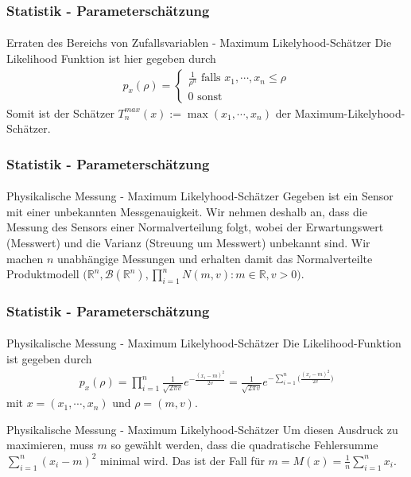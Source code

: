 \documentclass{beamer}
\begin{document}
\begin{frame}
    \frametitle{Statistik - Parameterschätzung}
\framesubtitle{}
\begin{block}{Erraten des Bereichs von Zufallsvariablen - Maximum Likelyhood-Schätzer}
Die Likelihood Funktion ist hier gegeben durch
\begin{align*}
p_x (\rho) =  \begin{cases}  \frac{1}{\rho^n}  \text{ falls }  x_1, \cdots , x_n \leq \rho  \\  0  \text{ sonst}\end {cases}
\end{align*}
Somit ist der Schätzer $T_n^{max} (x) := \max (x_1, \cdots , x_n )$ der Maximum-Likelyhood-Schätzer.
\end{block}

 \end{frame}




\begin{frame}
    \frametitle{Statistik - Parameterschätzung}
\framesubtitle{}
\begin{block}{Physikalische Messung - Maximum Likelyhood-Schätzer}
Gegeben ist ein Sensor mit einer unbekannten Messgenauigkeit. Wir nehmen deshalb an, dass die Messung des Sensors einer Normalverteilung folgt, 
wobei der Erwartungswert (Messwert) und die Varianz (Streuung um Messwert) unbekannt sind. Wir machen $n$ unabhängige Messungen und erhalten damit das Normalverteilte Produktmodell $\bigl(\mathbb{R}^n, \mathcal{B}(\mathbb{R}^n), \prod_{i=1}^n N(m,v): m \in \mathbb{R}, v  >0 \bigr)$. 

\end{block}

 \end{frame}



\begin{frame}
    \frametitle{Statistik - Parameterschätzung}
\framesubtitle{}
\begin{block}{Physikalische Messung - Maximum Likelyhood-Schätzer}
Die Likelihood-Funktion ist gegeben durch
\begin{align*}
p_x(\rho) =  \prod_{i=1}^n \frac {1}{ \sqrt{2 \pi v }} e^{- \frac{(x_i- m)^2}{ 2v}} =  \frac {1}{ \sqrt{2 \pi v }} e^{- \sum_{i=1}^n \bigl( \frac{(x_i- m)^2}{ 2v} \bigr)} 
\end{align*} 
mit $x = (x_1, \cdots, x_n)$ und $\rho=(m,v)$.
\end{block}

\begin{block}{Physikalische Messung - Maximum Likelyhood-Schätzer}
Um diesen Ausdruck zu maximieren, muss $m$ so gewählt werden, dass die quadratische Fehlersumme $ \sum_{i=1}^n (x_i- m)^2$ minimal wird.  Das ist der Fall für $m= M(x)= \frac{1}{n} \sum_{i=1}^n x_i$.
\end{block}

 \end{frame}
\end{document}
